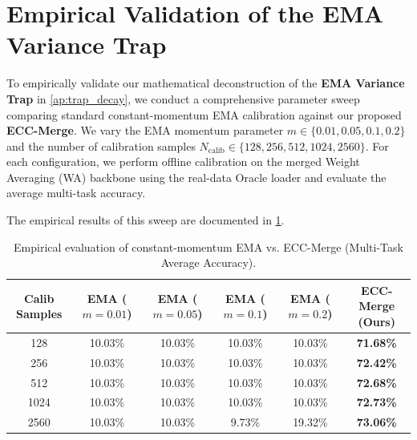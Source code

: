 \documentclass{article}
\theoremstyle{plain}
\theoremstyle{definition}
\theoremstyle{remark}
\begin{document}
\section{Empirical Validation of the EMA Variance Trap}
\label{ap:empirical_trap}
To empirically validate our mathematical deconstruction of the \textbf{EMA Variance Trap} in \cref{ap:trap_decay}, we conduct a comprehensive parameter sweep comparing standard constant-momentum EMA calibration against our proposed \textbf{ECC-Merge}. We vary the EMA momentum parameter $m \in \{0.01, 0.05, 0.1, 0.2\}$ and the number of calibration samples $N_{\text{calib}} \in \{128, 256, 512, 1024, 2560\}$. For each configuration, we perform offline calibration on the merged Weight Averaging (WA) backbone using the real-data Oracle loader and evaluate the average multi-task accuracy.

The empirical results of this sweep are documented in \cref{tab:ema_sweep}.

\begin{table}[h]
\caption{Empirical evaluation of constant-momentum EMA vs. ECC-Merge (Multi-Task Average Accuracy).}
\label{tab:ema_sweep}
\vskip 0.15in
\begin{center}
\begin{small}
\begin{sc}
\setlength{\tabcolsep}{4pt}
\begin{tabular}{cccccc}
\toprule
Calib Samples & EMA ($m{=}0.01$) & EMA ($m{=}0.05$) & EMA ($m{=}0.1$) & EMA ($m{=}0.2$) & ECC-Merge (Ours) \\
\midrule
128 & 10.03\% & 10.03\% & 10.03\% & 10.03\% & \textbf{71.68\%} \\
256 & 10.03\% & 10.03\% & 10.03\% & 10.03\% & \textbf{72.42\%} \\
512 & 10.03\% & 10.03\% & 10.03\% & 10.03\% & \textbf{72.68\%} \\
1024 & 10.03\% & 10.03\% & 10.03\% & 10.03\% & \textbf{72.73\%} \\
2560 & 10.03\% & 10.03\% & 9.73\% & 19.32\% & \textbf{73.06\%} \\
\bottomrule
\end{tabular}
\end{sc}
\end{small}
\end{center}
\vskip -0.1in
\end{table}
\end{document}
